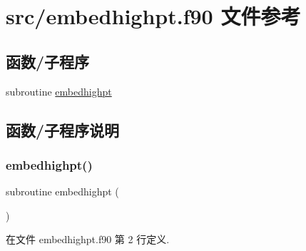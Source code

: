 \hypertarget{embedhighpt_8f90}{}\section{src/embedhighpt.f90 文件参考}
\label{embedhighpt_8f90}
\subsection*{函数/子程序}
\begin{DoxyCompactItemize}
\item 
subroutine \mbox{\hyperlink{embedhighpt_8f90_a22af742159568425bbfc1a79bae99eb4}{embedhighpt}}
\end{DoxyCompactItemize}


\subsection{函数/子程序说明}
\mbox{\label{embedhighpt_8f90_a22af742159568425bbfc1a79bae99eb4}} 
\subsubsection{\texorpdfstring{embedhighpt()}{embedhighpt()}}
{\footnotesize\ttfamily subroutine embedhighpt (\begin{DoxyParamCaption}{ }\end{DoxyParamCaption})}



在文件 embedhighpt.\+f90 第 2 行定义.

